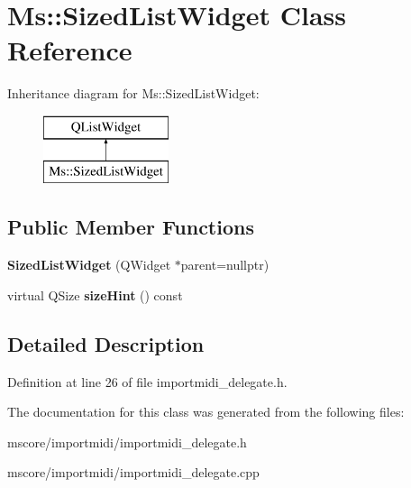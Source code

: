 \hypertarget{class_ms_1_1_sized_list_widget}{}\section{Ms\+:\+:Sized\+List\+Widget Class Reference}
\label{class_ms_1_1_sized_list_widget}
Inheritance diagram for Ms\+:\+:Sized\+List\+Widget\+:\begin{figure}[H]
\begin{center}
\leavevmode
\includegraphics[height=2.000000cm]{class_ms_1_1_sized_list_widget}
\end{center}
\end{figure}
\subsection*{Public Member Functions}
\begin{DoxyCompactItemize}
\item 
\mbox{\label{class_ms_1_1_sized_list_widget_a062409c332cc9311d81306ac134e8034}} 
{\bfseries Sized\+List\+Widget} (Q\+Widget $\ast$parent=nullptr)
\item 
\mbox{\label{class_ms_1_1_sized_list_widget_a00a4a3ecbce8367ab7ef6cc38a64d801}} 
virtual Q\+Size {\bfseries size\+Hint} () const
\end{DoxyCompactItemize}


\subsection{Detailed Description}


Definition at line 26 of file importmidi\+\_\+delegate.\+h.



The documentation for this class was generated from the following files\+:\begin{DoxyCompactItemize}
\item 
mscore/importmidi/importmidi\+\_\+delegate.\+h\item 
mscore/importmidi/importmidi\+\_\+delegate.\+cpp\end{DoxyCompactItemize}
